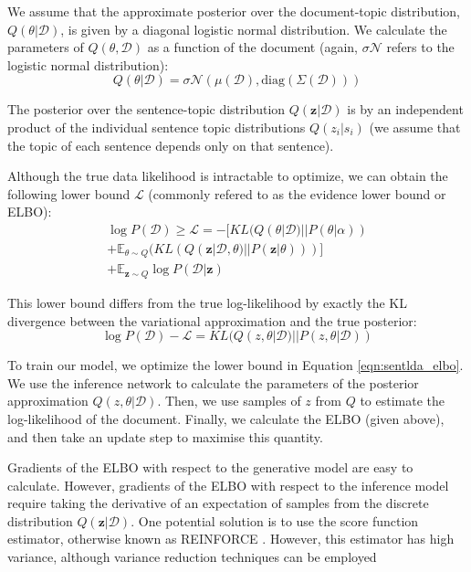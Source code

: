 We assume that the approximate posterior over the document-topic distribution, $Q(\theta | \mathcal{D})$, is given by a diagonal logistic normal distribution. We calculate the parameters of $Q(\theta, \mathcal{D})$ as a function of the document (again, $\sigma \mathcal{N}$ refers to the logistic normal distribution): 
\begin{equation}
Q(\theta | \mathcal{D}) = \sigma \mathcal{N}(\mu(\mathcal{D}), \mathrm{diag}(\Sigma(\mathcal{D})))
\label{eqn:theta_posterior}
\end{equation}

The posterior over the sentence-topic distribution $Q(\mathbf{z}| \mathcal{D})$ is by an independent product of the individual sentence topic distributions $Q(z_i | s_i)$ (we assume that the topic of each sentence depends only on that sentence). 

Although the true data likelihood is intractable to optimize, we can obtain the following lower bound $\mathcal{L}$ (commonly refered to as the evidence lower bound or ELBO):
\begin{multline}
\label{eqn:sentlda_elbo}
\log P(\mathcal{D}) \geq \mathcal{L} =  - [KL(Q(\theta|\mathcal{D}) || P(\theta | \alpha)) \\ + \mathbb{E}_{\theta \sim Q}(KL(Q(\mathbf{z} | \mathcal{D}, \theta) || P(\mathbf{z} | \theta)))] \\ + \mathbb{E}_{\mathbf{z} \sim Q} \log P(\mathcal{D} | \mathbf{z})
\end{multline}

This lower bound differs from the true log-likelihood by exactly the KL divergence between the variational approximation and the true posterior:
\begin{equation}
\log P(\mathcal{D}) - \mathcal{L} = KL(Q(z, \theta | \mathcal{D}) || P(z, \theta | \mathcal{D}))
\label{eqn:ELBO_gap}
\end{equation}

To train our model, we optimize the lower bound in Equation \ref{eqn:sentlda_elbo}. We use the inference network to calculate the parameters of the posterior approximation $Q(z, \theta| \mathcal{D})$. Then, we use samples of $z$ from $Q$ to estimate the log-likelihood of the document. Finally, we calculate the ELBO (given above), and then take an update step to maximise this quantity.

Gradients of the ELBO with respect to the generative model are easy to calculate. However, gradients of the ELBO with respect to the inference model require taking the derivative of an expectation of samples from the discrete distribution $Q(\mathbf{z}|\mathcal{D})$. One potential solution is to use the score function estimator, otherwise known as REINFORCE \citep{Williams:92}. However, this estimator has high variance, although variance reduction techniques can be employed \citep{Greensmith:04,Mnih:14}

